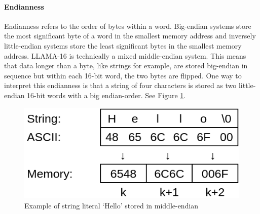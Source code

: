 \documentclass[man,hidelinks,floatsintext]{apa7}
\begin{document}
\paragraph{Endianness}
Endianness refers to the order of bytes within a word. Big-endian systems store the most significant byte of a word in the smallest memory address and inversely little-endian systems store the least significant bytes in the smallest memory address. LLAMA-16 is technically a mixed middle-endian system. This means that data longer than a byte, like strings for example, are stored big-endian in sequence but within each 16-bit word, the two bytes are flipped. One way to interpret this endianness is that a string of four characters is stored as two little-endian 16-bit words with a big endian-order. See Figure \ref{fig:endianness}.
\begin{figure}[h]
  \centering
  \captionsetup{justification=centering}
  \includegraphics[width=.5\textwidth]{endianness}
  \vspace*{3mm}
  \caption{Example of string literal `Hello' stored in middle-endian}
  \label{fig:endianness}
\end{figure}
\end{document}
